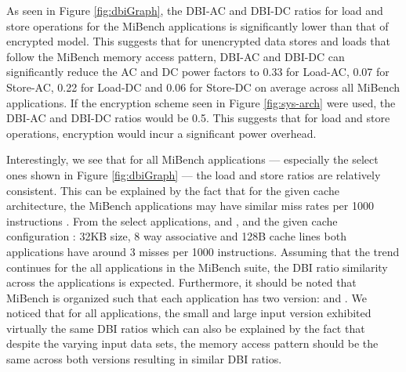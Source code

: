 As seen in Figure \ref{fig:dbiGraph}, the DBI-AC and DBI-DC ratios for load and
store operations for the MiBench applications is significantly lower than that
of encrypted model. This suggests that for unencrypted data stores and loads
that follow the MiBench memory access pattern, DBI-AC and DBI-DC can
significantly reduce the AC and DC power factors to 0.33 for Load-AC,
0.07 for Store-AC, 0.22 for Load-DC and 0.06 for Store-DC on average across all
MiBench applications. If the encryption scheme seen in Figure
\ref{fig:sys-arch} were used, the DBI-AC and DBI-DC ratios would be 0.5. This
suggests that for load and store operations, encryption would incur a
significant power overhead.

Interestingly, we see that for all MiBench applications --- especially the
select ones shown in Figure \ref{fig:dbiGraph} --- the load and store ratios
are relatively consistent. This can be explained by the fact that for the given
cache architecture, the MiBench applications may have similar miss rates per
1000 instructions \cite{mibench}. From the select applications, 
and , and the given cache configuration : 32KB size, 8 way
associative and 128B cache lines both applications have around 3 misses per
1000 instructions. Assuming that the trend continues for the all applications
in the MiBench suite, the DBI ratio similarity across the applications is
expected. Furthermore, it should be noted that MiBench is organized such that
each application has two version:  and . We
noticed that for all applications, the small and large input version exhibited
virtually the same DBI ratios which can also be explained by the fact that
despite the varying input data sets, the memory access pattern should be the
same across both versions resulting in similar DBI ratios.
